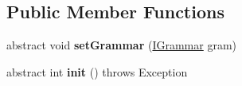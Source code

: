 \subsection*{Public Member Functions}
\begin{DoxyCompactItemize}
\item 
\hypertarget{classcontext_free_1_1parser_1_1_l_r0_ab87079bb387c26bad40d3678e80eefc9}{abstract void {\bfseries set\-Grammar} (\hyperlink{interfacecontext_free_1_1grammar_1_1_i_grammar}{I\-Grammar} gram)}\label{classcontext_free_1_1parser_1_1_l_r0_ab87079bb387c26bad40d3678e80eefc9}

\item 
\hypertarget{classcontext_free_1_1parser_1_1_l_r0_a1936c0d9c7c80de80a5b3913f8f710b7}{abstract int {\bfseries init} ()  throws Exception}\label{classcontext_free_1_1parser_1_1_l_r0_a1936c0d9c7c80de80a5b3913f8f710b7}


\end{DoxyCompactItemize}
